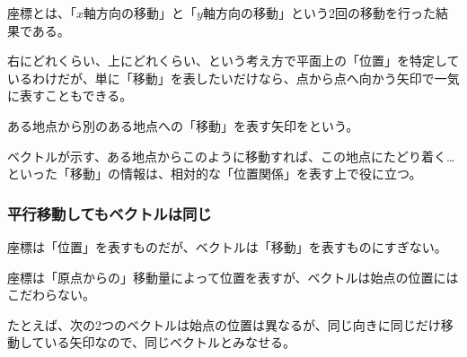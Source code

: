 \documentclass[../imaging-math]{subfiles}
\begin{document}
\br

座標とは、「$x$軸方向の移動」と「$y$軸方向の移動」という2回の移動を行った結果である。

右にどれくらい、上にどれくらい、という考え方で平面上の「位置」を特定しているわけだが、単に「移動」を表したいだけなら、点から点へ向かう矢印で一気に表すこともできる。

\br

ある地点から別のある地点への「移動」を表す矢印をという。

\br

ベクトルが示す、ある地点からこのように移動すれば、この地点にたどり着く…といった「移動」の情報は、相対的な「位置関係」を表す上で役に立つ。

\subsubsection{平行移動してもベクトルは同じ}

座標は「位置」を表すものだが、ベクトルは「移動」を表すものにすぎない。

座標は「原点からの」移動量によって位置を表すが、ベクトルは始点の位置にはこだわらない。

\br

たとえば、次の2つのベクトルは始点の位置は異なるが、同じ向きに同じだけ移動している矢印なので、同じベクトルとみなせる。

\begin{center}
\end{center}
\end{document}
